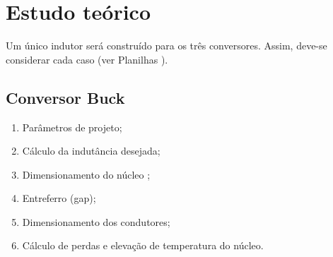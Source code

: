 




\section{Estudo teórico}

Um único indutor será construído para os três conversores. Assim, deve-se considerar cada caso (ver Planilhas \cite{noauthor_ptc_nodate}).

\subsection{Conversor Buck}
\begin{enumerate}	
	\item Parâmetros de projeto; 	
	\item Cálculo da indutância desejada;	
	\item Dimensionamento do núcleo \cite{noauthor_thornton_nodate};	
	\item Entreferro (gap);
	\item  Dimensionamento dos condutores;
	\item Cálculo de perdas e elevação de temperatura do núcleo.
\end{enumerate}


